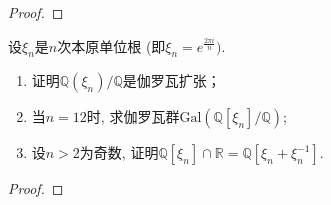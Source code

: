 \begin{proof}
    
\end{proof}

\begin{problem}
    设$\xi_n$是$n$次本原单位根 (即$\xi_n = e^{\frac{2\pi i}n})$.
\begin{enumerate}[(1)]
    \item 证明$\mathbb{Q}(\xi_n)/\mathbb{Q}$是伽罗瓦扩张；
    \item 当$n = 12$时, 求伽罗瓦群$\mathrm{Gal}(\mathbb{Q}[\xi_n]/\mathbb{Q})$;
    \item 设$n > 2$为奇数, 证明$\mathbb{Q}[\xi_n] \cap \mathbb{R} = \mathbb{Q}[\xi_n + \xi_n^{-1}]$.
\end{enumerate}
\end{problem}

\begin{proof}
    
\end{proof}